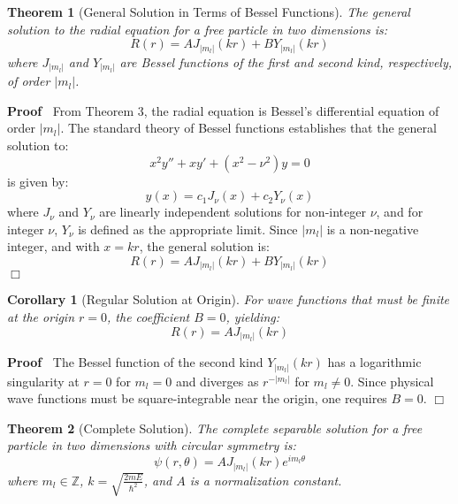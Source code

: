 \documentclass{article}
\newenvironment{proof}{\noindent\textbf{Proof\ }}{\hspace*{\fill}$\Box$\medskip}
\newtheorem{corollary}{Corollary}
\newtheorem{theorem}{Theorem}
\begin{document}
\begin{theorem}
  [General Solution in Terms of Bessel Functions] The general solution to the
  radial equation for a free particle in two dimensions is:
  \begin{equation}
    R (r) = AJ_{|m_l |}  (kr) + BY_{|m_l |}  (kr)
  \end{equation}
  where $J_{|m_l |}$ and $Y_{|m_l |}$ are Bessel functions of the first and
  second kind, respectively, of order $|m_l |$.
\end{theorem}

\begin{proof}
  From Theorem 3, the radial equation is Bessel's differential equation of
  order $|m_l |$. The standard theory of Bessel functions establishes that the
  general solution to:
  \begin{equation}
    x^2 y'' + xy' + (x^2 - \nu^2) y = 0
  \end{equation}
  is given by:
  \begin{equation}
    y (x) = c_1 J_{\nu} (x) + c_2 Y_{\nu} (x)
  \end{equation}
  where $J_{\nu}$ and $Y_{\nu}$ are linearly independent solutions for
  non-integer $\nu$, and for integer $\nu$, $Y_{\nu}$ is defined as the
  appropriate limit. Since $|m_l |$ is a non-negative integer, and with $x =
  kr$, the general solution is:
  \begin{equation}
    R (r) = AJ_{|m_l |}  (kr) + BY_{|m_l |}  (kr)
  \end{equation}
\end{proof}

\begin{corollary}
  [Regular Solution at Origin] For wave functions that must be finite at the
  origin $r = 0$, the coefficient $B = 0$, yielding:
  \begin{equation}
    R (r) = AJ_{|m_l |}  (kr)
  \end{equation}
\end{corollary}

\begin{proof}
  The Bessel function of the second kind $Y_{|m_l |}  (kr)$ has a logarithmic
  singularity at $r = 0$ for $m_l = 0$ and diverges as $r^{- |m_l |}$ for $m_l
  \neq 0$. Since physical wave functions must be square-integrable near the
  origin, one requires $B = 0$.
\end{proof}

\begin{theorem}
  [Complete Solution] The complete separable solution for a free particle in
  two dimensions with circular symmetry is:
  \begin{equation}
    \psi (r, \theta) = AJ_{|m_l |}  (kr) e^{im_l \theta}
  \end{equation}
  where $m_l \in \mathbb{Z}$, $k = \sqrt{\frac{2 mE}{\hbar^2}}$, and $A$ is a
  normalization constant.
\end{theorem}
\end{document}
